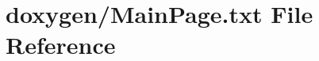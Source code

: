 \hypertarget{MainPage_8txt}{\section{doxygen/\+Main\+Page.txt File Reference}
\label{MainPage_8txt}
}
